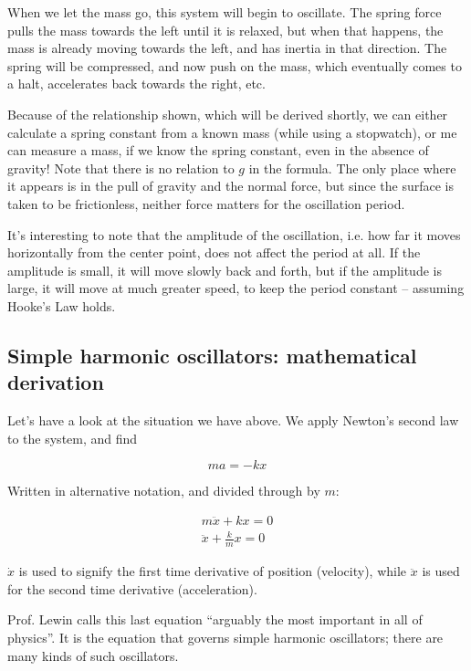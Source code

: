 \documentclass[12pt,a4paper]{report}
\begin{document}
When we let the mass go, this system will begin to oscillate. The spring force pulls the mass towards the left until it is relaxed, but when that happens, the mass is already moving towards the left, and has inertia in that direction. The spring will be compressed, and now push on the mass, which eventually comes to a halt, accelerates back towards the right, etc.

Because of the relationship shown, which will be derived shortly, we can either calculate a spring constant from a known mass (while using a stopwatch), or me can measure a mass, if we know the spring constant, even in the absence of gravity! Note that there is no relation to $g$ in the formula. The only place where it appears is in the pull of gravity and the normal force, but since the surface is taken to be frictionless, neither force matters for the oscillation period.

It's interesting to note that the amplitude of the oscillation, i.e. how far it moves horizontally from the center point, does not affect the period at all. If the amplitude is small, it will move slowly back and forth, but if the amplitude is large, it will move at much greater speed, to keep the period constant -- assuming Hooke's Law holds.

\subsection{Simple harmonic oscillators: mathematical derivation}

Let's have a look at the situation we have above. We apply Newton's second law to the system, and find

\begin{equation}
m a = - k x
\end{equation}

Written in alternative notation, and divided through by $m$:

\begin{align}
m \ddot{x} + k x = 0\\
\ddot{x} + \frac{k}{m} x = 0
\end{align}

$\dot{x}$ is used to signify the first time derivative of position (velocity), while $\ddot{x}$ is used for the second time derivative (acceleration).

Prof. Lewin calls this last equation ``arguably the most important in all of physics''. It is the equation that governs simple harmonic oscillators; there are many kinds of such oscillators.
\end{document}
